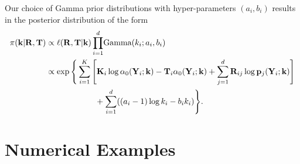 \documentclass[final]{siamltex}
\begin{document}
Our choice of Gamma prior distributions with hyper-parameters $(a_i, b_i)$ results in the posterior distribution of the form
\begin{align}
	\pi(\mathbf{k}|\mathbf{R}, \mathbf{T}) &\propto \ell(\mathbf{R}, \mathbf{T}|\mathbf{k})
	\prod_{i=1}^d \! \text{Gamma}(k_i; a_i, b_i) \notag \\
		&\propto \exp\Bigg\{\sum\limits_{i=1}^K \Bigg[
				\mathbf{K}_i\log \alpha_0(\mathbf{Y}_i; \mathbf{k}) - \mathbf{T}_i\alpha_0(\mathbf{Y}_i; \mathbf{k}) %
				+\sum_{j=1}^d \mathbf{R}_{ij}\log\mathbf{p}_j(\mathbf{Y}_i; \mathbf{k})
			\Bigg]  \notag\\
		&	\qquad\qquad\qquad{} + \sum_{i=1}^d ((a_i-1)\log k_i - b_ik_i)\Bigg\}. \label{eqn:chem_posterior}
\end{align}

\section{Numerical Examples}\label{sec:num}
\end{document}
